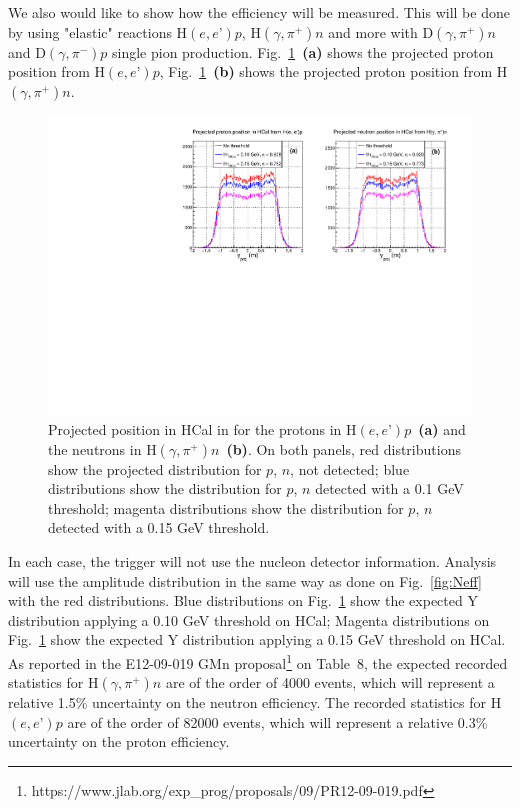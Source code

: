 \documentclass[11pt]{article}
\begin{document}
We also would like to show how the efficiency will be measured.
This will be done by using "elastic" reactions H$(e,e’)p$, H$(\gamma,\pi^+)n$
and more with D$(\gamma,\pi^+)n$ and D$(\gamma,\pi^-)p$ single pion production.
Fig.~\ref{fig:Nproj}~{\bf(a)} shows the projected proton position from H$(e,e’)p$, 
Fig.~\ref{fig:Nproj}~{\bf(b)} shows the projected proton position from H$(\gamma,\pi^+)n$.
%
\begin{figure}[!h]
  \centering
  \includegraphics[width=12cm]{ProtVsNeut_CalibYproj.pdf}
  \caption{Projected position in HCal in for the protons in H$(e,e’)p$~{\bf(a)} and the neutrons in H$(\gamma,\pi^+)n$~{\bf(b)}. On both panels, red distributions show the projected distribution for $p$, $n$, not detected; blue distributions show the distribution for $p$, $n$ detected with a 0.1 GeV threshold; magenta distributions show the distribution for $p$, $n$ detected with a 0.15 GeV threshold.}
  \label{fig:Nproj}
\end{figure}
%
In each case, the trigger will not use the nucleon detector information.
Analysis will use the amplitude distribution in the same way as done on  Fig.~\ref{fig:Neff} with the red distributions.
Blue distributions on Fig.~\ref{fig:Nproj} show the expected Y distribution applying a 0.10 GeV threshold on HCal;
Magenta distributions on Fig.~\ref{fig:Nproj} show the expected Y distribution applying a 0.15 GeV threshold on HCal.
As reported in the E12-09-019 GMn proposal\footnote{https://www.jlab.org/exp\_prog/proposals/09/PR12-09-019.pdf} on Table~8, the expected recorded statistics for H$(\gamma,\pi^+)n$ are of the order of 4000 events, which will represent a relative 1.5\% uncertainty on the neutron efficiency. The recorded statistics for H$(e,e’)p$ are of the order of 82000 events, which will represent a relative 0.3\% uncertainty on the proton efficiency.\\
\end{document}
